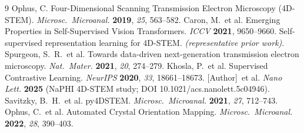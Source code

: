 \documentclass[journal=ancac3,manuscript=article,layout=twocolumn]{achemso}
\begin{document}
\begin{thebibliography}{9}
 Ophus, C. Four-Dimensional Scanning Transmission Electron
Microscopy (4D-STEM). \emph{Microsc.\ Microanal.} \textbf{2019}, \emph{25},
563--582.
 Caron, M.\ et al. Emerging Properties in Self-Supervised
Vision Transformers. \emph{ICCV} \textbf{2021}, 9650--9660.
 Self-supervised representation learning for 4D-STEM.
\emph{(representative prior work)}.
 Spurgeon, S.\ R.\ et al. Towards data-driven
next-generation transmission electron microscopy. \emph{Nat.\ Mater.}
\textbf{2021}, \emph{20}, 274--279.
 Khosla, P.\ et al. Supervised Contrastive Learning.
\emph{NeurIPS} \textbf{2020}, \emph{33}, 18661--18673.
 [Author]\ et al. \emph{Nano Lett.} \textbf{2025}
(NaPHI 4D-STEM study; DOI 10.1021/acs.nanolett.5c04946).
 Savitzky, B.\ H.\ et al. py4DSTEM. \emph{Microsc.\
Microanal.} \textbf{2021}, \emph{27}, 712--743.
 Ophus, C.\ et al. Automated Crystal Orientation Mapping.
\emph{Microsc.\ Microanal.} \textbf{2022}, \emph{28}, 390--403.
\end{thebibliography}
\end{document}
